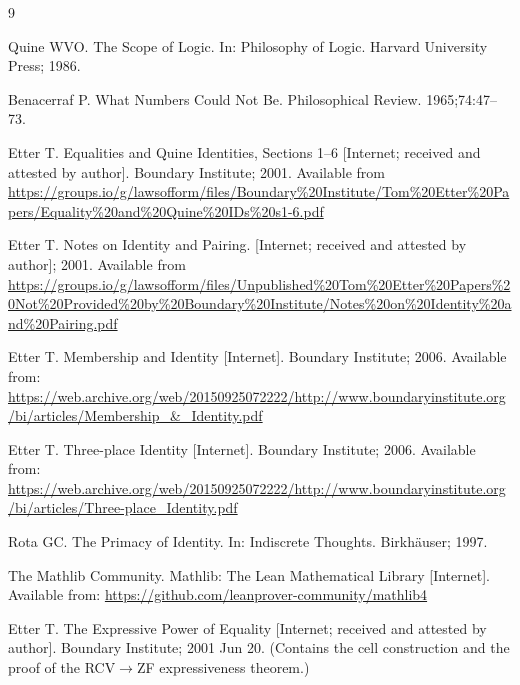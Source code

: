 \documentclass{ws-rv9x6}
\theoremstyle{remark}
\begin{document}
\begin{thebibliography}{9}

Quine WVO. The Scope of Logic. In: Philosophy of Logic. Harvard University Press; 1986.

Benacerraf P. What Numbers Could Not Be. Philosophical Review. 1965;74:47–73.

    Etter T. Equalities and Quine Identities, Sections 1--6 [Internet; received and attested by author]. Boundary Institute; 2001. Available from \url{https://groups.io/g/lawsofform/files/Boundary%20Institute/Tom%20Etter%20Papers/Equality%20and%20Quine%20IDs%20s1-6.pdf}

    Etter T. Notes on Identity and Pairing. [Internet; received and attested by author]; 2001. Available from \url{https://groups.io/g/lawsofform/files/Unpublished%20Tom%20Etter%20Papers%20Not%20Provided%20by%20Boundary%20Institute/Notes%20on%20Identity%20and%20Pairing.pdf}

    Etter T. Membership and Identity [Internet]. Boundary Institute; 2006. Available from: \url{https://web.archive.org/web/20150925072222/http://www.boundaryinstitute.org/bi/articles/Membership_&_Identity.pdf}

    Etter T. Three-place Identity [Internet]. Boundary Institute; 2006. Available from: \url{https://web.archive.org/web/20150925072222/http://www.boundaryinstitute.org/bi/articles/Three-place_Identity.pdf}

Rota GC. The Primacy of Identity. In: Indiscrete Thoughts. Birkh\"auser; 1997.

    The Mathlib Community. Mathlib: The Lean Mathematical Library [Internet]. Available from: \url{https://github.com/leanprover-community/mathlib4}

    Etter T. The Expressive Power of Equality [Internet; received and attested by author]. Boundary Institute; 2001 Jun 20. (Contains the cell construction and the proof of the RCV$\to$ZF expressiveness theorem.)

\end{thebibliography}
\end{document}
